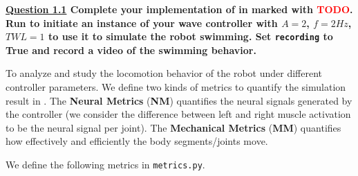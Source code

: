 \documentclass{cmc}
\begin{document}
\textbf{\underline{Question 1.1} Complete your implementation of  in  marked with \textcolor{red}{TODO}. Run  to initiate an instance of your wave controller with $A=2$, $f=2Hz$, $TWL=1$ to use it to simulate the robot swimming. Set \texttt{recording} to True and record a video of the swimming behavior.}

To analyze and study the locomotion behavior of the robot under different controller parameters. We define two kinds of metrics to quantify the simulation result in . The \textbf{Neural Metrics} (\textbf{NM}) quantifies the neural signals generated by the controller (we consider the difference between left and right muscle activation to be the neural signal per joint). The \textbf{Mechanical Metrics} (\textbf{MM}) quantifies how effectively and efficiently the body segments/joints move.

We define the following metrics in \texttt{metrics.py}.
\end{document}
